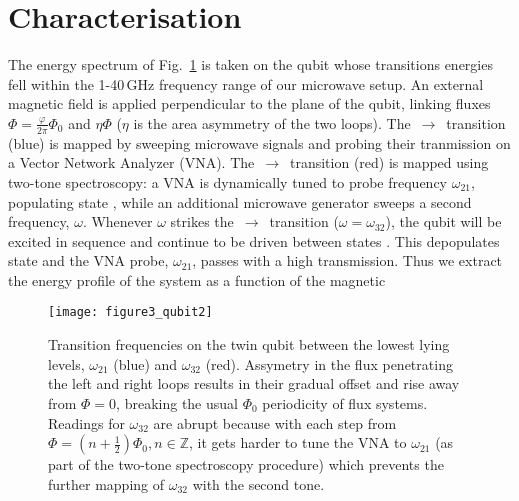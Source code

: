 \section{Characterisation}
\label{sec:characterisation}
The energy spectrum of Fig.~\ref{fig:experiment} is taken on the qubit whose transitions energies fell within the 1-40\,GHz
frequency range of our microwave setup. An external magnetic field is applied perpendicular to the plane of the qubit, linking
fluxes $ \Phi = \frac{\varphi}{2\pi}\Phi_0$ and $ \eta\Phi $ ($ \eta $ is the area asymmetry of the two loops). The
$\,\rightarrow\,$ transition (blue) is mapped by sweeping microwave signals and probing their tranmission on a Vector
Network Analyzer (VNA). The $\,\rightarrow\,$ transition (red) is mapped using two-tone spectroscopy: a VNA is dynamically
tuned to probe frequency $ \omega_{21} $, populating state , while an additional microwave generator sweeps a second frequency,
$ \omega $. Whenever $\omega$ strikes the $ \,\rightarrow\,$ transition ($\omega = \omega_{32} $), the qubit will be excited in sequence
 \ira {} \ira {} and continue to be driven between states  . This depopulates state 
and the VNA probe, $ \omega_{21} $, passes with a high transmission. Thus we extract the energy profile of the system as a function of
the magnetic


\begin{figure}[h]
  \texttt{[image: figure3\_qubit2]}
  \caption{\small Transition frequencies on the twin qubit between the lowest lying levels, $ \omega_{21} $ (blue) and
    $ \omega_{32}$ (red). Assymetry in the flux penetrating the left and right loops results in their gradual offset and rise away from
    $ \Phi = 0 $, breaking the usual $ \Phi_0 $ periodicity of flux systems. Readings for $ \omega_{32} $ are abrupt because with each step
    from $ \Phi = (n + \frac{1}{2})\Phi_0, n\in\mathbb{Z} $, it gets harder to tune the VNA to $ \omega_{21} $ (as part of the two-tone
    spectroscopy procedure) which prevents the further mapping of $ \omega_{32} $ with the second tone.}
  \label{fig:experiment}
\end{figure}

